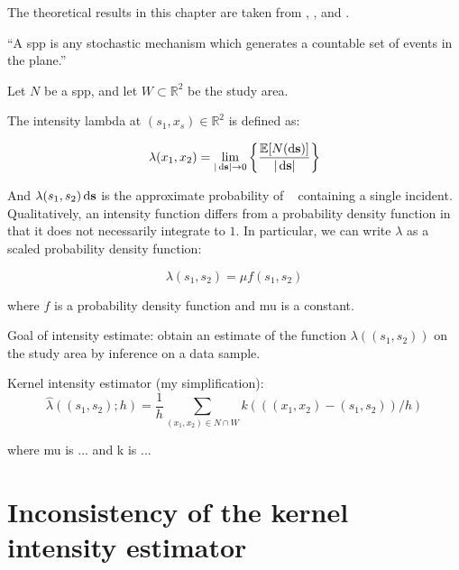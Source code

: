 


The theoretical results in this chapter are taken from \citet{diggle1988equivalence}, \citet{guan2008consistent}, and \citet{wand1994kernel}.

\begin{defn}
``A \gls{spp} is any stochastic mechanism which generates a countable set of events in the plane.''
\end{defn}

Let \(N\) be a \gls{spp}, and let \(W \subset \mathbb{R}^2 \) be the study area.

The intensity \gls{lambda} at \((s_1, x_s) \in \mathbb{R}^2\) is defined as:

\begin{equation}
\label{eq:lambda_differential}
    \lambda (x_1, x_2) = \lim_{|\ds| \to 0}
        \left\{
            \frac{\mathbb{E}[N(\ds)]}%
            {|\ds|}
        \right\}
\end{equation}

And \(\lambda(s_1, s_2) \mathop{}\!\mathrm{d}{\mathbf{s}}\) is the approximate probability of \ds~ containing a single incident.
Qualitatively, an intensity function differs from a probability density function in that it does not necessarily integrate to \(1\).
In particular, we can write \(\lambda\) as a scaled probability density function:

\begin{equation}
\label{eq:lambda_mu}
    \lambda(s_1, s_2) = \mu f\!(s_1, s_2)
\end{equation}

where \(f\) is a probability density function and \gls{mu} is a constant.

Goal of intensity estimate: obtain an estimate of the function \(\lambda((s_1, s_2))\) on the study area by inference on a data sample.

Kernel intensity estimator (my simplification):
\begin{equation}
\label{eq:lambda_hat}
    \hat{\lambda}((s_1, s_2); h) 
        = \frac{1}{h} \sum_{(x_1, x_2) \in N \cap W}
            {k(((x_1, x_2)-(s_1, s_2))/h)}
\end{equation}

where \gls{mu} is ... and \gls{k} is ...

%
%
\section{Inconsistency of the kernel intensity estimator}

